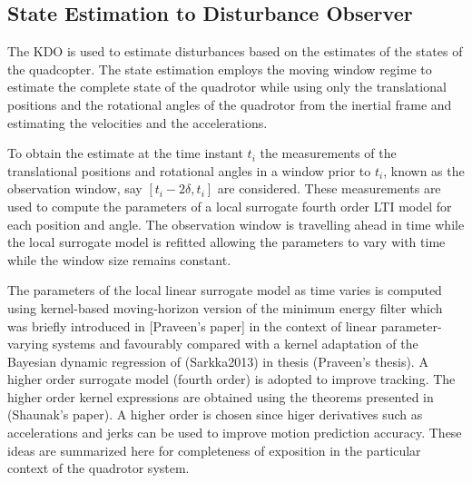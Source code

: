 \documentclass{article}
\begin{document}
\subsection{State Estimation to Disturbance Observer}
The KDO is used to estimate disturbances based on the estimates of the states of the quadcopter. The state estimation employs the moving window regime to estimate the complete state of the quadrotor while using only the translational positions and the rotational angles of the quadrotor from the inertial frame and estimating the velocities and the accelerations. 

To obtain the estimate at the time instant $t_i$ the measurements of the translational positions and rotational angles in a window prior to $t_i$, known as the observation window, say $[t_i-2\delta, t_i]$ are considered. These measurements are used to compute the parameters of a local surrogate fourth order LTI model for each position and angle. The observation window is travelling ahead in time while the local surrogate model is refitted allowing the parameters to vary with time while the window size remains constant.  

The parameters of the local linear surrogate model as time varies is computed using kernel-based moving-horizon version of the minimum energy filter which was briefly introduced in [Praveen's paper] in the context of linear parameter-varying systems and favourably compared with a kernel adaptation of the Bayesian dynamic regression of (Sarkka2013) in thesis (Praveen's thesis). A higher order surrogate model (fourth order) is adopted to improve tracking. The higher order kernel expressions are obtained using the theorems presented in (Shaunak's paper). A higher order is chosen since higer derivatives such as accelerations and jerks can be used to improve motion prediction accuracy. These ideas are summarized here for completeness of exposition in the particular context of the quadrotor system.
\end{document}
